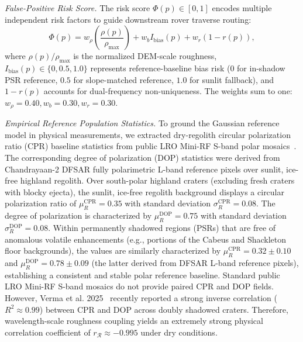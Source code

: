 \documentclass[10pt,conference]{IEEEtran}
\newcommand{\CPR}{\mathrm{CPR}}
\newcommand{\DOP}{\mathrm{DOP}}
\begin{document}
\textit{False-Positive Risk Score.}
The risk score $\Phi(p) \in [0,1]$ encodes multiple independent risk factors to guide downstream rover traverse routing:
\begin{equation}
\Phi(p) = w_{\rho} \left(\frac{\rho(p)}{\rho_{\max}}\right) + w_b I_{\mathrm{bias}}(p) + w_r (1 - r(p)),
\label{eq:fprisk}
\end{equation}
where $\rho(p)/\rho_{\max}$ is the normalized DEM-scale roughness, $I_{\mathrm{bias}}(p) \in \{0, 0.5, 1.0\}$ represents reference-baseline bias risk ($0$ for in-shadow PSR reference, $0.5$ for slope-matched reference, $1.0$ for sunlit fallback), and $1 - r(p)$ accounts for dual-frequency non-uniqueness. The weights sum to one: $w_{\rho} = 0.40, w_b = 0.30, w_r = 0.30$.

\textit{Empirical Reference Population Statistics.}
To ground the Gaussian reference model in physical measurements, we extracted dry-regolith circular polarization ratio (CPR) baseline statistics from public LRO Mini-RF S-band polar mosaics~\cite{spudis2013mini}. The corresponding degree of polarization (DOP) statistics were derived from Chandrayaan-2 DFSAR fully polarimetric L-band reference pixels over sunlit, ice-free highland regolith. Over south-polar highland craters (excluding fresh craters with blocky ejecta), the sunlit, ice-free regolith background displays a circular polarization ratio of $\mu_R^{\CPR} = 0.35$ with standard deviation $\sigma_R^{\CPR} = 0.08$. The degree of polarization is characterized by $\mu_R^{\DOP} = 0.75$ with standard deviation $\sigma_R^{\DOP} = 0.08$. Within permanently shadowed regions (PSRs) that are free of anomalous volatile enhancements (e.g., portions of the Cabeus and Shackleton floor backgrounds), the values are similarly characterized by $\mu_R^{\CPR} = 0.32 \pm 0.10$ and $\mu_R^{\DOP} = 0.78 \pm 0.09$ (the latter derived from DFSAR L-band reference pixels), establishing a consistent and stable polar reference baseline.
Standard public LRO Mini-RF S-band mosaics do not provide paired CPR and DOP fields. However, Verma et al. 2025~\cite{verma2025dfsar} recently reported a strong inverse correlation ($R^2 \approx 0.99$) between CPR and DOP across doubly shadowed craters. Therefore, wavelength-scale roughness coupling yields an extremely strong physical correlation coefficient of $r_{\mathcal{R}} \approx -0.995$ under dry conditions.
\end{document}
